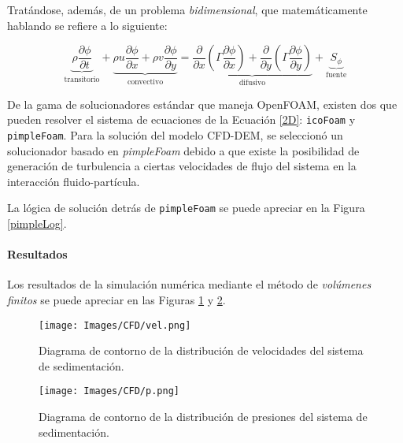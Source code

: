 Trat\'andose, adem\'as, de un problema \textit{bidimensional}, que matem\'aticamente hablando se refiere a lo siguiente:

\begin{equation}
    \underbrace{\rho \frac{\partial \phi}{\partial t}}_{\text{transitorio}} + \underbrace{\rho u \frac{\partial \phi}{\partial x} + \rho v \frac{\partial \phi}{\partial y}}_{\text{convectivo}} = \underbrace{ \frac{\partial}{\partial x} \left( \Gamma \frac{\partial \phi}{\partial x} \right) + \frac{\partial}{\partial y} \left( \Gamma \frac{\partial \phi}{\partial y} \right)}_{\text{difusivo}} + \underbrace{S_{\phi}}_{\text{fuente}}
    \tag{9}
    \label{2D}
\end{equation}

\noindent
\justify

De la gama de solucionadores est\'andar que maneja OpenFOAM, existen dos que pueden resolver el sistema de ecuaciones de la Ecuaci\'on \ref{2D}: \texttt{icoFoam} y \texttt{pimpleFoam}. Para la soluci\'on del modelo CFD-DEM, se seleccion\'o un solucionador basado en \textit{pimpleFoam} debido a que existe la posibilidad de generaci\'on de turbulencia a ciertas velocidades de flujo del sistema en la interacci\'on fluido-part\'icula.

\noindent
\justify

La l\'ogica de soluci\'on detr\'as de \texttt{pimpleFoam} se puede apreciar en la Figura \ref{pimpleLog}.



\newpage

\paragraph{Resultados} \label{CFD:resultados}

\noindent
\justify

Los resultados de la simulaci\'on num\'erica mediante el m\'etodo de \textit{vol\'umenes finitos} se puede apreciar en las Figuras \ref{CFD:vel} y \ref{CFD:p}.

\begin{figure}[h!]
	\centering
	\texttt{[image: Images/CFD/vel.png]}
	\caption{Diagrama de contorno de la distribuci\'on de velocidades del sistema de sedimentaci\'on.}
	\label{CFD:vel}
\end{figure}

\begin{figure}[h!]
	\centering
	\texttt{[image: Images/CFD/p.png]}
	\caption{Diagrama de contorno de la distribuci\'on de presiones del sistema de sedimentaci\'on.}
	\label{CFD:p}
\end{figure}

